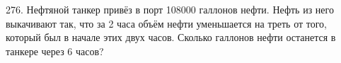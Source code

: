 276. Нефтяной танкер привёз в порт 108000 галлонов нефти. Нефть из него выкачивают так, что за 2 часа объём нефти уменьшается на треть от того, который был в начале этих двух часов. Сколько галлонов нефти останется в танкере через 6 часов?\\
